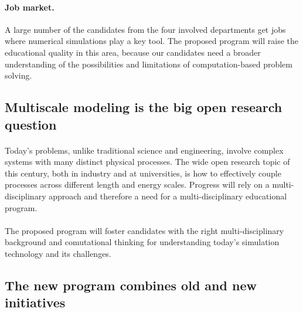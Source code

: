 \documentclass[%
twoside,                 %
final,                   %
10pt]{article}
\begin{document}
\paragraph{Job market.}
A large number of the candidates from the four involved departments
get jobs where numerical simulations play a key tool. The proposed
program will raise the educational quality in this area, because
our candidates need a broader understanding of the possibilities
and limitations of computation-based problem solving.



\subsection*{Multiscale modeling is the big open research question}


\paragraph{}
Today's problems, unlike traditional
science and engineering, involve complex systems with many distinct
physical processes. The wide open research topic of this century, both
in industry and at universities, is how to effectively couple
processes across different length and energy scales. Progress will
rely on a multi-disciplinary approach and therefore a need for
a multi-disciplinary educational program.




\paragraph{}
The proposed program will foster candidates with the right
multi-disciplinary background and comutational thinking for
understanding today's simulation technology and its challenges.




\subsection*{The new program combines old and new initiatives}

\paragraph{}
\end{document}
